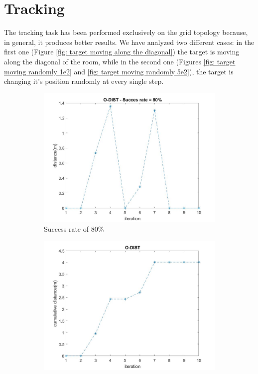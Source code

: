 \section{Tracking}

The tracking task has been performed exclusively on the grid topology because, in general, it produces better results.
We have analyzed two different cases: in the first one (Figure \ref{fig: target moving along the diagonal}) the target 
is moving along the diagonal of the room, while in the second one (Figures \ref{fig: target moving randomly 1e2} and \ref{fig: target moving randomly 5e2}), the target 
is changing it's position randomly at every single step.

\begin{figure}[H]
    \begin{subfigure}{0.45\textwidth}
        \centering
        \includegraphics[width=\textwidth]{img/O-DIST_diagonal_distance.jpg}
        \caption{Success rate of 80\%}
    \end{subfigure}
    \hfill
    \begin{subfigure}{0.45\textwidth}
        \centering
        \includegraphics[width=\textwidth]{img/O-DIST_diagonal_cumdist.jpg}

\end{subfigure}
\end{figure}
